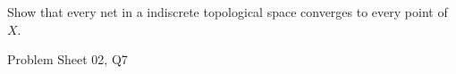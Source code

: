 \begin{samepage}
\begin{ex}
Show that every net in a indiscrete topological space converges to every point of $X$.
\end{ex}
\begin{source}
Problem Sheet 02, Q7
\end{source}
\end{samepage}
